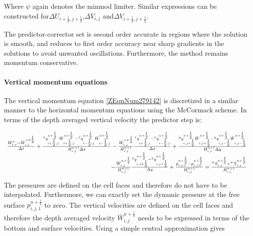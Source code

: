 \documentclass{article}
\begin{document}
\noindent Where $\psi $ again denotes the minmod limiter. Similar expressions can be constructed for$\Delta U_{i+{\tfrac{1}{2}} ,j+{\tfrac{1}{2}} }^{} $,$\Delta V_{i,j}^{} $ and$\Delta V_{i+{\tfrac{1}{2}} ,j+{\tfrac{1}{2}} }^{} $.

\noindent 

\noindent The predictor-corrector set is second order accurate in regions where the solution is smooth, and reduces to first order accuracy near sharp gradients in the solutions to avoid unwanted oscillations. Furthermore, the method remains momentum conservative.


\paragraph{ Vertical momentum equations}

\noindent The vertical momentum equation \eqref{ZEqnNum279142} is discretized in a similar manner to the horizontal momentum equations using the McCormack scheme. In terms of the depth averaged vertical velocity the predictor step is:

\noindent 
\begin{equation} \label{ZEqnNum523996} 
\begin{array}{r} {\frac{\bar{W}_{i,j}^{*} -\bar{W}_{i,j}^{n+{\tfrac{1}{2}} } }{\Delta t} +\frac{{}^{x} q_{i+{\tfrac{1}{2}} ,j}^{n+{\tfrac{1}{2}} } \bar{W}_{i+{\tfrac{1}{2}} ,j}^{n+{\tfrac{1}{2}} } -{}^{x} q_{i-{\tfrac{1}{2}} ,j}^{n+{\tfrac{1}{2}} } \bar{W}_{i-{\tfrac{1}{2}} ,j}^{n+{\tfrac{1}{2}} } }{H_{i,j}^{n+1} \Delta x} -\frac{\bar{W}_{i,j}^{n+{\tfrac{1}{2}} } }{H_{i,j}^{n+1} } \frac{{}^{x} q_{i+{\tfrac{1}{2}} ,j}^{n+{\tfrac{1}{2}} } -{}^{x} q_{i-{\tfrac{1}{2}} ,j}^{n+{\tfrac{1}{2}} } }{\Delta x} +\frac{{}^{y} q_{i,j+{\tfrac{1}{2}} }^{n+{\tfrac{1}{2}} } \bar{W}_{i,j+{\tfrac{1}{2}} }^{n+{\tfrac{1}{2}} } -{}^{y} q_{i,j-{\tfrac{1}{2}} }^{n+{\tfrac{1}{2}} } \bar{W}_{i,j-{\tfrac{1}{2}} }^{n+{\tfrac{1}{2}} } }{H_{i,j}^{n+1} \Delta y} } \\ {-\frac{\bar{W}_{i,j}^{n+{\tfrac{1}{2}} } }{H_{i,j}^{n+1} } \frac{{}^{y} q_{i,j+{\tfrac{1}{2}} }^{n+{\tfrac{1}{2}} } -{}^{y} q_{i,j-{\tfrac{1}{2}} }^{n+{\tfrac{1}{2}} } }{\Delta y} +\frac{p_{i,j,1}^{n+{\tfrac{1}{2}} } -p_{i,j,0}^{n+{\tfrac{1}{2}} } }{H_{i,j}^{n+1} } =\frac{{}^{w} {\rm S}_{i,j}^{n+{\tfrac{1}{2}} } +{}^{w} {\rm T}_{i,j}^{n+{\tfrac{1}{2}} } }{H_{i,j}^{n+1} } } \end{array} 
\end{equation} 


\noindent The pressures are defined on the cell faces and therefore do not have to be interpolated. Furthermore, we can exactly set the dynamic pressure at the free surface $p_{i,j,1}^{n+{\tfrac{1}{2}} } $ to zero. The vertical velocities are defined on the cell faces and therefore the depth averaged velocity $\bar{W}_{i,j}^{n+{\tfrac{1}{2}} } $ needs to be expressed in terms of the bottom and surface velocities. Using a simple central approximation gives
\end{document}
